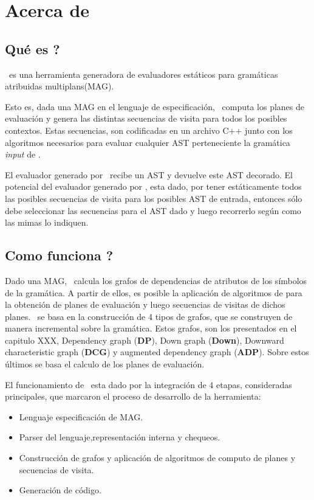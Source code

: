 \chapter{Acerca de \maggen}
\label{chap:disen_}
\minitoc

\section{\textquestiondown Qué es \maggen?}
\maggen\ es una herramienta generadora de evaluadores estáticos para gramáticas atribuidas multiplans(MAG). 

Esto es, dada una MAG en el lenguaje de especificación, \maggen\ computa los planes de evaluación y genera las distintas secuencias de visita para todos los posibles contextos. Estas secuencias, son codificadas en un archivo C++ junto con los algoritmos necesarios para evaluar cualquier AST perteneciente la gramática \textit{input} de \maggen.

El evaluador generado por \maggen\ recibe un AST y devuelve este AST decorado. El potencial del evaluador generado por \maggen, esta dado, por tener estáticamente todos las posibles secuencias de visita para los posibles AST de entrada, entonces sólo debe seleccionar las secuencias para el AST dado y luego recorrerlo según como las mimas lo indiquen.

\section{\textquestiondown Como funciona \maggen ?}
Dado una MAG, \maggen\ calcula los grafos de dependencias de atributos de los símbolos de la gramática. A partir de ellos, es posible la aplicación de algoritmos de para la obtención de planes de evaluación y luego secuencias de visitas de dichos planes. \maggen\ se basa en la construcción de 4 tipos de grafos, que se construyen de manera incremental sobre la gramática. Estos grafos, son los presentados en el capitulo XXX, Dependency graph (\textbf{DP}), Down graph (\textbf{Down}), Downward characteristic graph (\textbf{DCG}) y augmented dependency graph (\textbf{ADP}). Sobre estos últimos se basa el calculo de los planes de evaluación.

El funcionamiento de \maggen\ esta dado por la integración de 4 etapas, consideradas principales, que marcaron el proceso de desarrollo de la herramienta:
\begin{itemize}
\item Lenguaje especificación de MAG.
\item Parser del lenguaje,representación interna y chequeos.
\item Construcción de grafos y aplicación de algoritmos de computo de planes y secuencias de visita.
\item Generación de código.
\end{itemize}

